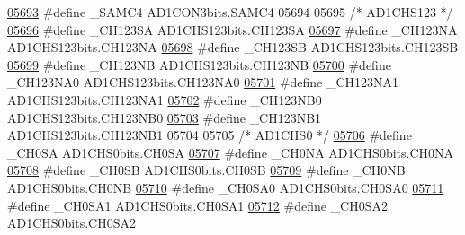 \begin{DoxyCode}
\hypertarget{a00009_source_l05693}{}\hyperlink{a00009_a9f33df27be16d43c237eba25be54bc64}{05693} \textcolor{preprocessor}{#define \_SAMC4 AD1CON3bits.SAMC4}
05694 
05695 \textcolor{comment}{/* AD1CHS123 */}
\hypertarget{a00009_source_l05696}{}\hyperlink{a00009_aaf42f71d9b656791219b05c89489e988}{05696} \textcolor{preprocessor}{#define \_CH123SA AD1CHS123bits.CH123SA}
\hypertarget{a00009_source_l05697}{}\hyperlink{a00009_ad83776a4e4e301d0108ed740daf77d03}{05697} \textcolor{preprocessor}{#define \_CH123NA AD1CHS123bits.CH123NA}
\hypertarget{a00009_source_l05698}{}\hyperlink{a00009_a0a5641c7d46fca95aca3e9d1acff8efd}{05698} \textcolor{preprocessor}{#define \_CH123SB AD1CHS123bits.CH123SB}
\hypertarget{a00009_source_l05699}{}\hyperlink{a00009_aeb7833ec65c59e94d022acebe0d84ae7}{05699} \textcolor{preprocessor}{#define \_CH123NB AD1CHS123bits.CH123NB}
\hypertarget{a00009_source_l05700}{}\hyperlink{a00009_a9b01040f8d7ecfd93410b04c96d43763}{05700} \textcolor{preprocessor}{#define \_CH123NA0 AD1CHS123bits.CH123NA0}
\hypertarget{a00009_source_l05701}{}\hyperlink{a00009_a0758b5c07a1c2df628fe620f96bc9d26}{05701} \textcolor{preprocessor}{#define \_CH123NA1 AD1CHS123bits.CH123NA1}
\hypertarget{a00009_source_l05702}{}\hyperlink{a00009_a0158ee03eb7e19da73e787b21fb2ea90}{05702} \textcolor{preprocessor}{#define \_CH123NB0 AD1CHS123bits.CH123NB0}
\hypertarget{a00009_source_l05703}{}\hyperlink{a00009_a81045ebecd686d1c3a625026e842900b}{05703} \textcolor{preprocessor}{#define \_CH123NB1 AD1CHS123bits.CH123NB1}
05704 
05705 \textcolor{comment}{/* AD1CHS0 */}
\hypertarget{a00009_source_l05706}{}\hyperlink{a00009_addc950f0262798414e51a711ab581007}{05706} \textcolor{preprocessor}{#define \_CH0SA AD1CHS0bits.CH0SA}
\hypertarget{a00009_source_l05707}{}\hyperlink{a00009_ade3a9989cfe7c9951f68237646711162}{05707} \textcolor{preprocessor}{#define \_CH0NA AD1CHS0bits.CH0NA}
\hypertarget{a00009_source_l05708}{}\hyperlink{a00009_a97cee619cacc5038c1ad54f471f03e1e}{05708} \textcolor{preprocessor}{#define \_CH0SB AD1CHS0bits.CH0SB}
\hypertarget{a00009_source_l05709}{}\hyperlink{a00009_a62e3fff2c85446f1fe888e65eaa5f2e4}{05709} \textcolor{preprocessor}{#define \_CH0NB AD1CHS0bits.CH0NB}
\hypertarget{a00009_source_l05710}{}\hyperlink{a00009_a851cd43497389d6fe72ba2c79ae61a88}{05710} \textcolor{preprocessor}{#define \_CH0SA0 AD1CHS0bits.CH0SA0}
\hypertarget{a00009_source_l05711}{}\hyperlink{a00009_af5bb45276b0c675ee0fc1f5ba07f4a3e}{05711} \textcolor{preprocessor}{#define \_CH0SA1 AD1CHS0bits.CH0SA1}
\hypertarget{a00009_source_l05712}{}\hyperlink{a00009_a1642ddd51d4b723ca68ed7a35c60fc87}{05712} \textcolor{preprocessor}{#define \_CH0SA2 AD1CHS0bits.CH0SA2}

\end{DoxyCode}
